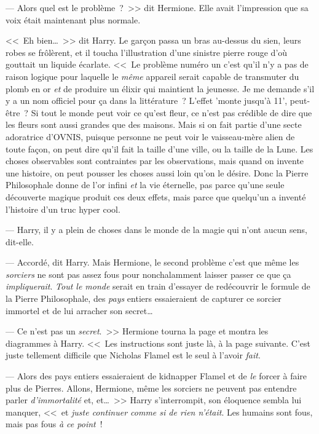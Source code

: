 --- Alors quel est le problème~?~>> dit Hermione. Elle avait l'impression que sa voix était maintenant plus normale.

<<~Eh bien…~>> dit Harry. Le garçon passa un bras au-dessus du sien, leurs robes se frôlèrent, et il toucha l'illustration d'une sinistre pierre rouge d'où gouttait un liquide écarlate. <<~Le problème numéro un c'est qu'il n'y a pas de raison logique pour laquelle le \emph{même} appareil serait capable de transmuter du plomb en or \emph{et} de produire un élixir qui maintient la jeunesse. Je me demande s'il y a un nom officiel pour ça dans la littérature~? L'effet 'monte jusqu'à 11', peut-être~? Si tout le monde peut voir ce qu'est fleur, ce n'est pas crédible de dire que les fleurs sont aussi grandes que des maisons. Mais si on fait partie d'une secte adoratrice d'OVNIS, puisque personne ne peut voir le vaisseau-mère alien de toute façon, on peut dire qu'il fait la taille d'une ville, ou la taille de la Lune. Les choses observables sont contraintes par les observations, mais quand on invente une histoire, on peut pousser les choses aussi loin qu'on le désire. Donc la Pierre Philosophale donne de l'or infini \emph{et} la vie éternelle, pas parce qu'une seule découverte magique produit ces deux effets, mais parce que quelqu'un a inventé l'histoire d'un truc hyper cool.

--- Harry, il y a plein de choses dans le monde de la magie qui n'ont aucun sens, dit-elle.

--- Accordé, dit Harry. Mais Hermione, le second problème c'est que même les \emph{sorciers} ne sont pas assez fous pour nonchalamment laisser passer ce que ça \emph{impliquerait}. \emph{Tout le monde} serait en train d'essayer de redécouvrir le formule de la Pierre Philosophale, des \emph{pays} entiers essaieraient de capturer ce sorcier immortel et de lui arracher son secret…

--- Ce n'est pas un \emph{secret}.~>> Hermione tourna la page et montra les diagrammes à Harry. <<~Les instructions sont juste là, à la page suivante. C'est juste tellement difficile que Nicholas Flamel est le seul à l'avoir \emph{fait}.

--- Alors des pays entiers essaieraient de kidnapper Flamel et de \emph{le} forcer à faire plus de Pierres. Allons, Hermione, même les sorciers ne peuvent pas entendre parler \emph{d'immortalité} et, et…~>> Harry s'interrompit, son éloquence sembla lui manquer, <<~et \emph{juste continuer comme si de rien n'était}. Les humains sont fous, mais pas fous \emph{à ce point}~!

